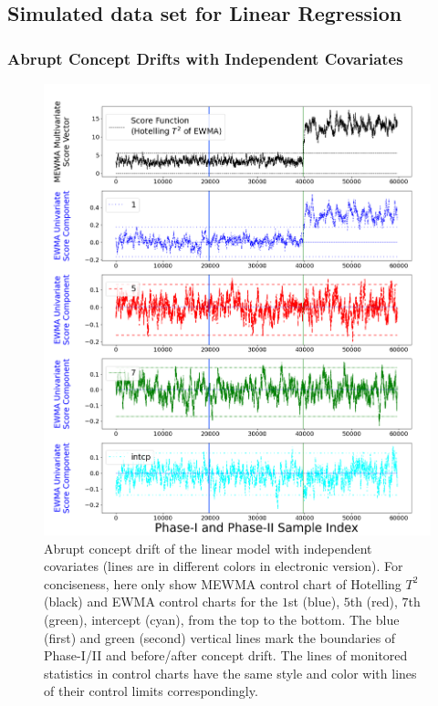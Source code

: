\documentclass[twoside,11pt]{article}
\begin{document}
\begin{appendix}
\subsection{Simulated data set for Linear Regression}
\label{sss:lin_exp}

\subsubsection{Abrupt Concept Drifts with Independent Covariates}
\label{ssss:lin_ind_pred}

\begin{figure}[!hpt]
\centering
  \includegraphics[width = 0.6\linewidth]{../figures/v14/sim_2/reg/neg_single_1_sim2_mlines_with_regu_1e-08_0_005.png}
  \caption{Abrupt concept drift of the linear model with independent covariates (lines are in different colors in electronic version). For conciseness, here only show MEWMA control chart of Hotelling $T^2$ (black) and EWMA control charts for the $1$st (blue), $5$th (red), $7$th (green), intercept (cyan), from the top to the bottom. The blue (first) and green (second) vertical lines mark the boundaries of Phase-I/II and before/after concept drift. The lines of monitored statistics in control charts have the same style and color with lines of their control limits correspondingly.}
  \label{fig:lin_reg_ind_X}
\end{figure}

\end{appendix}
\end{document}
